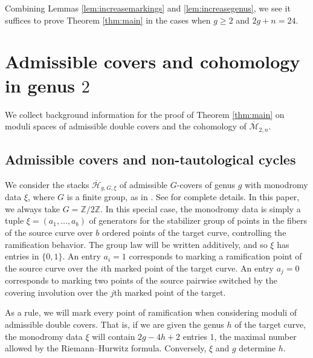 \documentclass[12pt]{amsart}
\theoremstyle{definition}
\newtheorem{example}[thm]{Example}
\newcommand{\zz}{\mathbb{Z}}
\newcommand{\Hb}{\overline{\mathcal{H}}}
\newcommand{\M}{\mathcal{M}}
\newcommand{\Mb}{\overline{\M}}
\begin{document}
Combining Lemmas \ref{lem:increasemarkings} and \ref{lem:increasegenus}, we see it suffices to prove Theorem \ref{thm:main} in the cases when $g\geq 2$ and $2g+n=24$.
\section{Admissible covers and cohomology in genus $2$}\label{sec:admcycles}
We collect background information for the proof of Theorem \ref{thm:main} on moduli spaces of admissible double covers and the cohomology of $\Mb_{2,n}$. 
\subsection{Admissible covers and non-tautological cycles}
We consider the stacks $\Hb_{g,G,\xi}$ of admissible $G$-covers of genus $g$ with monodromy data $\xi$, where $G$ is a finite group, as in \cite[Definitions 3.2 and 3.5]{SvZ}. See \cite{SvZ} for complete details. In this paper, we always take $G=\zz/2\zz$. In this special case, the monodromy data is simply a tuple $\xi=(a_1,\dots,a_b)$ of generators for the stabilizer group of points in the fibers of the source curve over $b$ ordered points of the target curve, controlling the ramification behavior. The group law will be written additively, and so $\xi$ has entries in $\{0,1\}$. An entry $a_i=1$ corresponds to marking a ramification point of the source curve over the $i$th marked point of the target curve. An entry $a_j=0$ corresponds to marking two points of the source pairwise switched by the covering involution over the $j$th marked point of the target.  


As a rule, we will mark every point of ramification when considering moduli of admissible double covers. That is, if we are given the genus $h$ of the target curve, the monodromy data $\xi$ will contain $2g-4h+2$ entries $1$, the maximal number allowed by the Riemann--Hurwitz formula. Conversely, $\xi$ and $g$ determine $h$.
\end{document}
